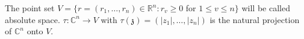 The point set $V = \{r = (r_1, \ldots, r_n) \in \mathbb{R}^n: r_v \geq 0$ for $1 \leq v \leq n\}$ will be called absolute space. $\tau: \mathbb{C}^n \rightarrow V$ with $\tau(\mathfrak{z}) = (\left|z_1\right|, \ldots, \left|z_n\right|)$ is the natural projection of $\mathbb{C}^n$ onto $V$.

